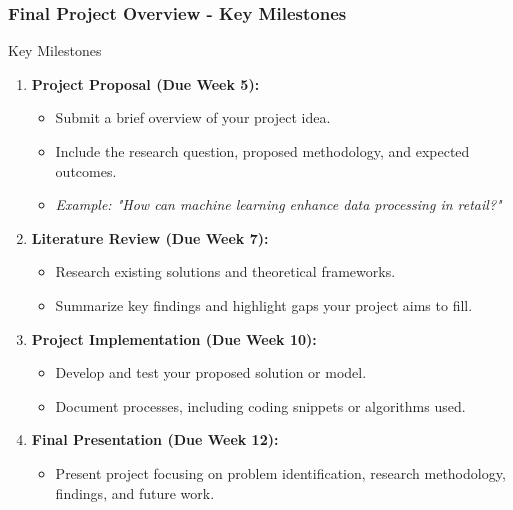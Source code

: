 \documentclass[aspectratio=169]{beamer}
\begin{document}
\begin{frame}[fragile]
    \frametitle{Final Project Overview - Key Milestones}
    \begin{block}{Key Milestones}
        \begin{enumerate}
            \item \textbf{Project Proposal (Due Week 5):} 
            \begin{itemize}
                \item Submit a brief overview of your project idea.
                \item Include the research question, proposed methodology, and expected outcomes.
                \item \textit{Example: "How can machine learning enhance data processing in retail?"}
            \end{itemize}
            
            \item \textbf{Literature Review (Due Week 7):} 
            \begin{itemize}
                \item Research existing solutions and theoretical frameworks.
                \item Summarize key findings and highlight gaps your project aims to fill.
            \end{itemize}
            
            \item \textbf{Project Implementation (Due Week 10):} 
            \begin{itemize}
                \item Develop and test your proposed solution or model.
                \item Document processes, including coding snippets or algorithms used.
            \end{itemize}

            \item \textbf{Final Presentation (Due Week 12):}
            \begin{itemize}
                \item Present project focusing on problem identification, research methodology, findings, and future work.
            \end{itemize}
        \end{enumerate}
    \end{block}
\end{frame}
\end{document}
